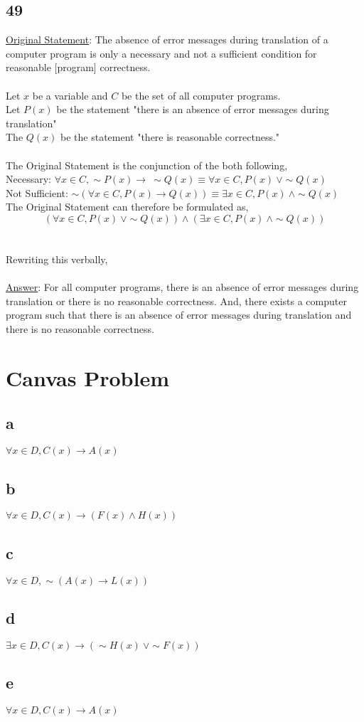 \documentclass[12pt]{article}
\begin{document}
\subsection*{49}
\underline{Original Statement}: The absence of error messages during translation of a computer program is only a necessary and not a sufficient condition for reasonable [program] correctness.
\\ \\
Let $x$ be a variable and $C$ be the set of all computer programs. \\
Let $P(x)$ be the statement "there is an absence of error messages during translation" \\
The $Q(x)$ be the statement "there is reasonable correctness." 
\\ \\
The Original Statement is the conjunction of the both following, \\
Necessary: $\forall x \in C,\sim P(x) \rightarrow \ \sim Q(x) \equiv \forall x \in C,P(x) \ \vee \sim Q(x)$ \\
Not Sufficient: $\sim(\forall x \in C,P(x) \rightarrow Q(x)) \equiv \exists x \in C,P(x) \ \wedge \sim Q(x)$ \\
The Original Statement can therefore be formulated as, 
$$(\forall x \in C,P(x) \ \vee \sim Q(x)) \wedge (\exists x \in C,P(x) \ \wedge \sim Q(x))$$
\\ \\
Rewriting this verbally,
\\ \\
\underline{Answer}: For all computer programs, there is an absence of error messages during translation or there is no reasonable correctness.
And, there exists a computer program such that there is an absence of error messages during translation and there is no reasonable correctness.

\section*{Canvas Problem}
\subsection*{a}
$\forall x \in D, C(x) \rightarrow A(x)$

\subsection*{b}
$\forall x \in D, C(x) \rightarrow (F(x) \wedge H(x))$

\subsection*{c}
$\forall x \in D,\sim(A(x) \rightarrow L(x))$

\subsection*{d}
$\exists x \in D, C(x) \rightarrow (\sim H(x) \ \vee \sim F(x))$

\subsection*{e}
$\forall x \in D, C(x) \rightarrow A(x)$
\end{document}
